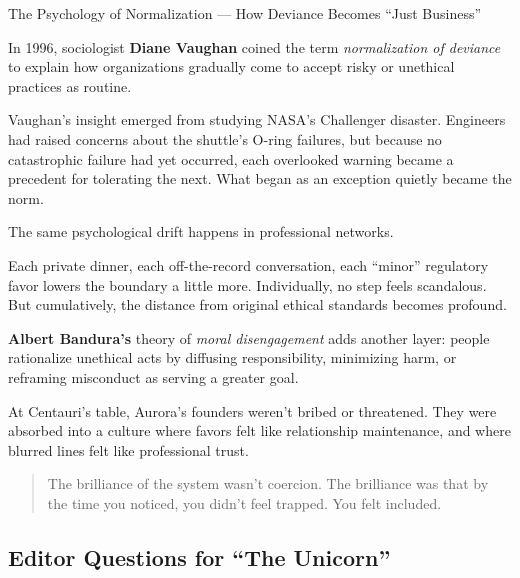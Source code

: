 \begin{PsychologicalSidebar}{The Psychology of Normalization --- How Deviance Becomes ``Just Business''}

  In 1996, sociologist \textbf{Diane Vaughan} coined the term \emph{normalization of deviance} to explain how 
  organizations gradually come to accept risky or unethical practices as routine.

  \medskip
  
  Vaughan’s insight emerged from studying NASA’s Challenger disaster. Engineers had raised concerns about the 
  shuttle’s O-ring failures, but because no catastrophic failure had yet occurred, each overlooked warning became 
  a precedent for tolerating the next. What began as an exception quietly became the norm.

  \medskip
  
  The same psychological drift happens in professional networks.

  \medskip
  
  Each private dinner, each off-the-record conversation, each “minor” regulatory favor lowers the boundary a little more. 
  Individually, no step feels scandalous. But cumulatively, the distance from original ethical standards becomes profound.

  \medskip
  
  \textbf{Albert Bandura’s} theory of \emph{moral disengagement} adds another layer: people rationalize unethical acts by 
  diffusing responsibility, minimizing harm, or reframing misconduct as serving a greater goal.

  \medskip
  
  At Centauri’s table, Aurora’s founders weren’t bribed or threatened. They were absorbed into 
  a culture where favors felt like relationship maintenance, and where blurred lines felt like professional trust.
  
  \begin{quote}
  The brilliance of the system wasn’t coercion.  The brilliance was that by the time you noticed, you didn’t feel trapped.  
  You felt included.
  \end{quote}
  
\end{PsychologicalSidebar}

\medskip

\subsection*{Editor Questions for ``The Unicorn''}

